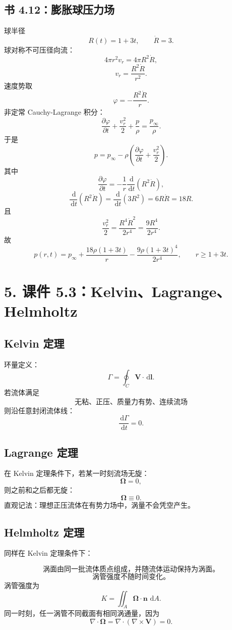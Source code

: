﻿\documentclass[UTF8,zihao=-4]{ctexart}
\newcommand{\dd}{\,\mathrm d}
\begin{document}
\subsection*{书 4.12：膨胀球压力场}

球半径
\[
R(t)=1+3t,\qquad \dot R=3.
\]
球对称不可压径向流：
\[
4\pi r^2v_r=4\pi R^2\dot R,
\]
\[
v_r=\frac{R^2\dot R}{r^2}.
\]
速度势取
\[
\varphi=-\frac{R^2\dot R}{r}.
\]
非定常 Cauchy-Lagrange 积分：
\[
\frac{\partial\varphi}{\partial t}
+\frac{v_r^2}{2}
+\frac p\rho
=\frac{p_\infty}{\rho}.
\]
于是
\[
p=p_\infty-\rho\left(
\frac{\partial\varphi}{\partial t}
+\frac{v_r^2}{2}
\right).
\]
其中
\[
\frac{\partial\varphi}{\partial t}
=-\frac1r\frac{\dd}{\dd t}(R^2\dot R),
\]
\[
\frac{\dd}{\dd t}(R^2\dot R)
=\frac{\dd}{\dd t}(3R^2)
=6R\dot R=18R.
\]
且
\[
\frac{v_r^2}{2}
=\frac{R^4\dot R^2}{2r^4}
=\frac{9R^4}{2r^4}.
\]
故
\[
\boxed{
p(r,t)=p_\infty
+\frac{18\rho(1+3t)}{r}
-\frac{9\rho(1+3t)^4}{2r^4},
\qquad r\ge 1+3t.}
\]

\section*{5. 课件 5.3：Kelvin、Lagrange、Helmholtz}

\subsection*{Kelvin 定理}

环量定义：
\[
\Gamma=\oint_C\bm V\cdot\dd\bm l.
\]
若流体满足
\[
\boxed{\text{无粘、正压、质量力有势、连续流场}}
\]
则沿任意封闭流体线：
\[
\boxed{\frac{\dd\Gamma}{\dd t}=0.}
\]

\subsection*{Lagrange 定理}

在 Kelvin 定理条件下，若某一时刻流场无旋：
\[
\bm\Omega=0,
\]
则之前和之后都无旋：
\[
\boxed{\bm\Omega\equiv0.}
\]
直观记法：理想正压流体在有势力场中，涡量不会凭空产生。

\subsection*{Helmholtz 定理}

同样在 Kelvin 定理条件下：

\[
\boxed{\text{涡面由同一批流体质点组成，并随流体运动保持为涡面。}}
\]
\[
\boxed{\text{涡管强度不随时间变化。}}
\]
涡管强度为
\[
\boxed{
K=\iint_A\bm\Omega\cdot\bm n\,\dd A.}
\]
同一时刻，任一涡管不同截面有相同涡通量，因为
\[
\nabla\cdot\bm\Omega=\nabla\cdot(\nabla\times\bm V)=0.
\]
\end{document}
